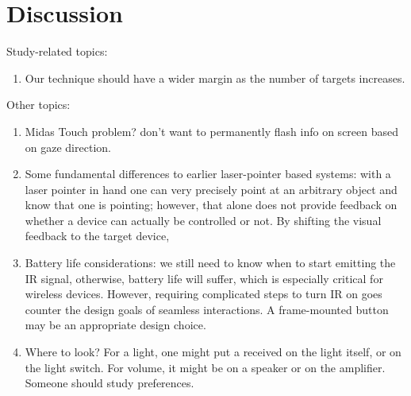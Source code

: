 \section{Discussion}

Study-related topics:
\begin{enumerate}
\item Our technique should have a wider margin as the number of targets increases.

\end{enumerate}

Other topics:
\begin{enumerate}
\item Midas Touch problem? don't want to permanently flash info on screen based on gaze direction.
\item Some fundamental differences to earlier laser-pointer based systems: with a laser pointer in hand one can very precisely point at an arbitrary object and know that one is pointing; however, that alone does not provide feedback on whether a device can actually be controlled or not. By shifting the visual feedback to the target device, 

\item Battery life considerations: we still need to know when to start emitting the IR signal, otherwise, battery life will suffer, which is especially critical for wireless devices. However, requiring complicated steps to turn IR on goes counter the design goals of seamless interactions. A frame-mounted button may be an appropriate design choice.

\item Where to look? For a light, one might put a received on the light itself, or on the light switch. For volume, it might be on a speaker or on the amplifier. Someone should study preferences.
\end{enumerate}

